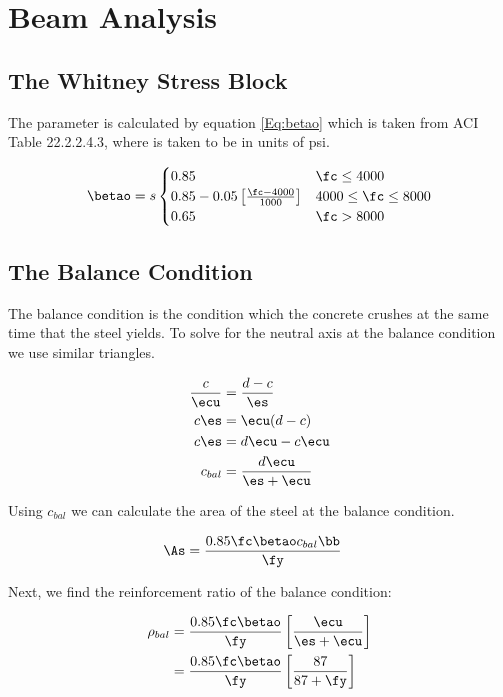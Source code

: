 
\section{Beam Analysis}
\subsection{The Whitney Stress Block}

The parameter \betao is calculated by equation \ref{Eq:betao} which is taken from ACI Table 22.2.2.4.3, where \fc  is taken to be in units of psi.

\begin{align}
	\betao
	=s
	\begin{cases}
		0.85 & \fc \leq 4000 \\
		0.85-0.05\left[\frac{\fc-4000}{1000}\right] & 4000 \leq\fc\leq 8000 \\
		0.65 & \fc > 8000
	\end{cases}
	\label{Eq:betao}
\end{align}



\subsection{The Balance Condition}

The balance condition is the condition which the concrete crushes at the same time that the steel yields. To solve for the neutral axis at the balance condition we use similar triangles.

\begin{align}
	\frac{c}{\ecu} &= \frac{d-c}{\es}\\ 
	c \es &= \ecu(d-c)\\ 
	c \es &= d\ecu -c\ecu\\ 
	c_{bal} &= \frac{d\ecu}{\es+\ecu}
\end{align}


Using $c_{bal}$ we can calculate the area of the steel \As at the balance condition.

\begin{align}
	\As &= \frac{0.85\fc\betao c_{bal}\bb}{\fy}
\end{align}

Next, we find the reinforcement ratio of the balance condition:

\begin{align}
	\rho_{bal} &= \frac{0.85\fc\betao}{\fy}
	\left[
		\frac{\ecu}{\es+\ecu}
	\right]\\
	&= 
	\frac{0.85\fc\betao}{\fy}
	\left[
		\frac{87}{87+\fy}
	\right]
\end{align}




